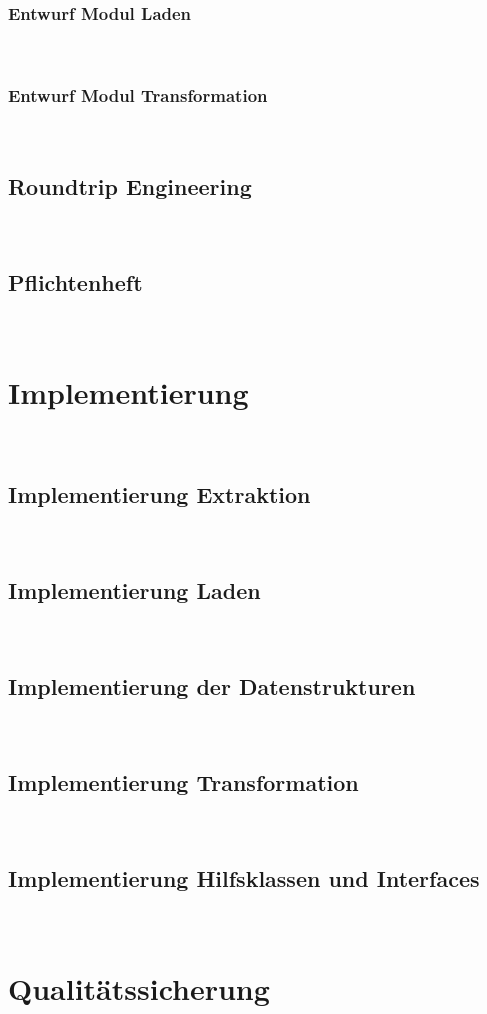 \documentclass[11pt,toc=sectionentrywithoutdots, 
headheight=44pt, headings=optiontoheadandtoc, hyperfootnotes=false, hypertexnames=false]{scrartcl}
\begin{document}
\subsubsection{Entwurf Modul Laden}
\blindtext\

\subsubsection{Entwurf Modul Transformation}
\blindtext\

\subsection{Roundtrip Engineering}
\blindtext\

\subsection{Pflichtenheft}
\blindtext\

\section{Implementierung}
\blindtext\

\subsection{Implementierung Extraktion}
\blindtext\

\subsection{Implementierung Laden}
\blindtext\

\subsection{Implementierung der Datenstrukturen}
\blindtext\

\subsection{Implementierung Transformation}
\blindtext\

\subsection{Implementierung Hilfsklassen und Interfaces}
\blindtext\

\section{Qualitätssicherung}
\blindtext\
\end{document}
